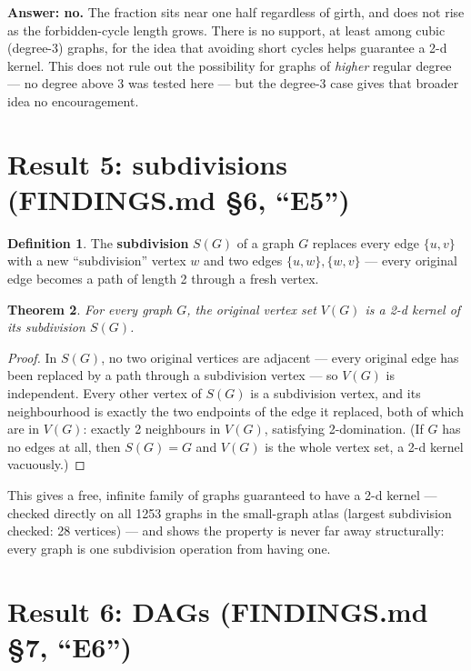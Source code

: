 \documentclass[11pt]{article}
\theoremstyle{plain}
\newtheorem{theorem}{Theorem}[section]
\theoremstyle{definition}
\newtheorem{definition}[theorem]{Definition}
\theoremstyle{remark}
\begin{document}
\textbf{Answer: no.} The fraction sits near one half regardless of girth, and does not
rise as the forbidden-cycle length grows. There is no support, at least among cubic
(degree-3) graphs, for the idea that avoiding short cycles helps guarantee a 2-d kernel.
This does not rule out the possibility for graphs of \emph{higher} regular degree — no
degree above 3 was tested here — but the degree-3 case gives that broader idea no
encouragement.

\section{Result 5: subdivisions (FINDINGS.md \S6, ``E5'')}

\begin{definition}
The \textbf{subdivision} $S(G)$ of a graph $G$ replaces every edge $\{u,v\}$ with a new
``subdivision'' vertex $w$ and two edges $\{u,w\}, \{w,v\}$ — every original edge
becomes a path of length 2 through a fresh vertex.
\end{definition}

\begin{theorem}
For every graph $G$, the original vertex set $V(G)$ is a 2-d kernel of its subdivision
$S(G)$.
\end{theorem}

\begin{proof}
In $S(G)$, no two original vertices are adjacent — every original edge has been
replaced by a path through a subdivision vertex — so $V(G)$ is independent. Every
other vertex of $S(G)$ is a subdivision vertex, and its neighbourhood is exactly the
two endpoints of the edge it replaced, both of which are in $V(G)$: exactly 2
neighbours in $V(G)$, satisfying 2-domination. (If $G$ has no edges at all, then
$S(G) = G$ and $V(G)$ is the whole vertex set, a 2-d kernel vacuously.)
\end{proof}

This gives a free, infinite family of graphs guaranteed to have a 2-d kernel — checked
directly on all 1253 graphs in the small-graph atlas (largest subdivision checked: 28
vertices) — and shows the property is never far away structurally: every graph is one
subdivision operation from having one.

\section{Result 6: DAGs (FINDINGS.md \S7, ``E6'')}
\label{sec:e6}
\end{document}
